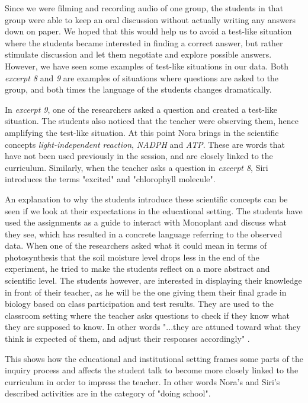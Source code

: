 Since we were filming and recording audio of one group, the students in that group were able to keep an oral discussion without actually writing any answers down on paper. We hoped that this would help us to avoid a test-like situation where the students became interested in finding a correct answer, but rather stimulate discussion and let them negotiate and explore possible answers. However, we have seen some examples of test-like situations in our data. Both \emph{excerpt 8} and \emph{9} are examples of situations where questions are asked to the group, and both times the language of the students changes dramatically. 

In \emph{excerpt 9}, one of the researchers asked a question and created a test-like situation. The students also noticed that the teacher were observing them, hence amplifying the test-like situation. At this point Nora brings in the scientific concepts \emph{light-independent reaction}, \emph{NADPH} and \emph{ATP}. These are words that have not been used previously in the session, and are closely linked to the curriculum. Similarly, when the teacher asks a question in \emph{excerpt 8}, Siri introduces the terms "excited" and "chlorophyll molecule".

An explanation to why the students introduce these scientific concepts can be seen if we look at their expectations in the educational setting. The students have used the assignments as a guide to interact with Monoplant and discuss what they see, which has resulted in a concrete language referring to the observed data. When one of the researchers asked what it could mean in terms of photosynthesis that the soil moisture level drops less in the end of the experiment, he tried to make the students reflect on a more abstract and scientific level. The students however, are interested in displaying their knowledge in front of their teacher, as he will be the one giving them their final grade in biology based on class participation and test results. They are used to the classroom setting where the teacher asks questions to check if they know what they are supposed to know. In other words "...they are attuned toward what they think is expected of them, and adjust their responses accordingly" \citep{furberg2009socio}. 

This shows how the educational and institutional setting frames some parts of the inquiry process and affects the student talk to become more closely linked to the curriculum in order to impress the teacher. In other words Nora's and Siri's described activities are in the category of "doing school".


